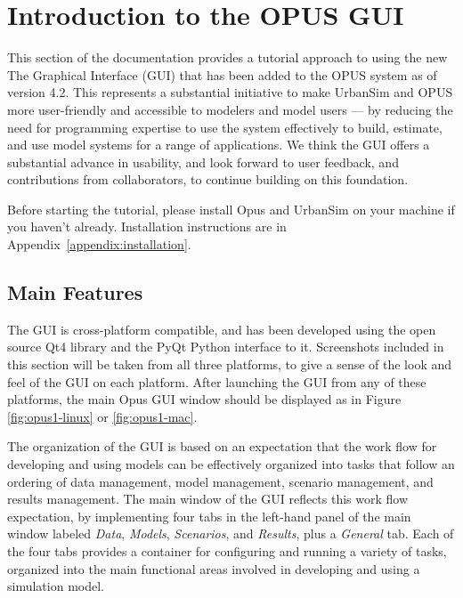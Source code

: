 \chapter{Introduction to the OPUS GUI}

This section of the documentation provides a tutorial approach to using the
new The Graphical Interface (GUI) that has been added to the OPUS system as
of version 4.2.  This represents a substantial initiative to make UrbanSim
and OPUS more user-friendly and accessible to modelers and model users ---
by reducing the need for programming expertise to use the system
effectively to build, estimate, and use model systems for a range of
applications.  We think the GUI offers a substantial advance in usability,
and look forward to user feedback, and contributions from collaborators, to
continue building on this foundation.

Before starting the tutorial, please install Opus and UrbanSim on your
machine if you haven't already.  Installation instructions are in
Appendix~\ref{appendix:installation}.

\section{Main Features}

The GUI is cross-platform compatible, and has been developed using the open
source Qt4 library and the PyQt Python interface to it.  Screenshots
included in this section will be taken from all three platforms, to give a
sense of the look and feel of the GUI on each platform.  After launching
the GUI from any of these platforms, the main Opus GUI window should be
displayed as in Figure \ref{fig:opus1-linux} or \ref{fig:opus1-mac}.

The organization of the GUI is based on an expectation that the work flow
for developing and using models can be effectively organized into tasks
that follow an ordering of data management, model management, scenario
management, and results management.  The main window of the GUI reflects
this work flow expectation, by implementing four tabs in the left-hand
panel of the main window labeled \emph{Data}, 
\emph{Models},
\emph{Scenarios},
and \emph{Results},
plus a \emph{General} tab.  Each of
the four tabs provides a container for configuring and running a variety of
tasks, organized into the main functional areas involved in developing and
using a simulation model.

